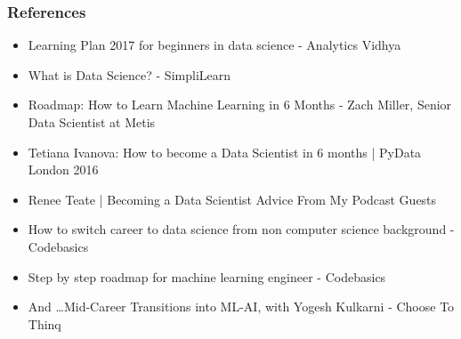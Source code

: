 \begin{frame}[fragile]\frametitle{References}
\begin{itemize}
\item Learning Plan 2017 for beginners in data science - Analytics Vidhya
\item What is Data Science? - SimpliLearn
\item Roadmap: How to Learn Machine Learning in 6 Months -  Zach Miller, Senior Data Scientist at Metis
\item Tetiana Ivanova: How to become a Data Scientist in 6 months | PyData London 2016
\item Renee Teate | Becoming a Data Scientist Advice From My Podcast Guests
\item How to switch career to data science from non computer science background - Codebasics
\item Step by step roadmap for machine learning engineer - Codebasics
\item And \ldots Mid-Career Transitions into ML-AI, with Yogesh Kulkarni - Choose To Thinq
\end{itemize}
\end{frame}

